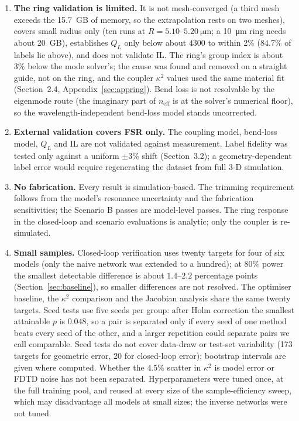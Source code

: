 \documentclass[11pt]{article}
\newcommand{\QL}{Q_L}
\begin{document}
\begin{enumerate}[leftmargin=1.6em,itemsep=3pt]
\item \textbf{The ring validation is limited.} It is not mesh-converged (a third mesh exceeds the \SI{15.7}{GB} of memory, so the extrapolation rests on two meshes), covers small radius only (ten runs at $R = 5.10$--$\SI{5.20}{\micro\metre}$; a \SI{10}{\micro\metre} ring needs about \SI{20}{GB}), establishes $\QL$ only below about $4300$ to within 2\% ($84.7\%$ of labels lie above), and does not validate IL. The ring's group index is about $3\%$ below the mode solver's; the cause was found and removed on a straight guide, not on the ring, and the coupler $\kappa^2$ values used the same material fit (Section~2.4, Appendix~\ref{sec:appring}). Bend loss is not resolvable by the eigenmode route (the imaginary part of $n_{\mathrm{eff}}$ is at the solver's numerical floor), so the wavelength-independent bend-loss model stands uncorrected.
\item \textbf{External validation covers FSR only.} The coupling model, bend-loss model, $\QL$ and IL are not validated against measurement. Label fidelity was tested only against a uniform $\pm3\%$ shift (Section~3.2); a geometry-dependent label error would require regenerating the dataset from full 3-D simulation.
\item \textbf{No fabrication.} Every result is simulation-based. The trimming requirement follows from the model's resonance uncertainty and the fabrication sensitivities; the Scenario B passes are model-level passes. The ring response in the closed-loop and scenario evaluations is analytic; only the coupler is re-simulated.
\item \textbf{Small samples.} Closed-loop verification uses twenty targets for four of six models (only the naive network was extended to a hundred); at $80\%$ power the smallest detectable difference is about $1.4$--$2.2$ percentage points (Section~\ref{sec:baseline}), so smaller differences are not resolved. The optimiser baseline, the $\kappa^2$ comparison and the Jacobian analysis share the same twenty targets. Seed tests use five seeds per group: after Holm correction the smallest attainable $p$ is $0.048$, so a pair is separated only if every seed of one method beats every seed of the other, and a larger repetition could separate pairs we call comparable. Seed tests do not cover data-draw or test-set variability (173 targets for geometric error, 20 for closed-loop error); bootstrap intervals are given where computed. Whether the $4.5\%$ scatter in $\kappa^2$ is model error or FDTD noise has not been separated. Hyperparameters were tuned once, at the full training pool, and reused at every size of the sample-efficiency sweep, which may disadvantage all models at small sizes; the inverse networks were not tuned.

\end{enumerate}
\end{document}
